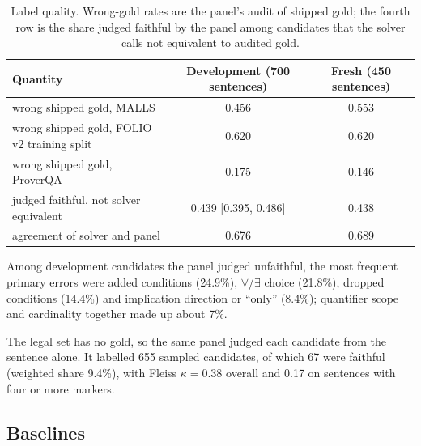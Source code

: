 \documentclass[11pt,letterpaper]{article}
\newcommand{\fe}{$\forall$/$\exists$}
\begin{document}
\begin{table}[!htbp]
  \centering
  \small
  \caption{Label quality. Wrong-gold rates are the panel's audit of shipped gold; the fourth row is the share judged faithful by the panel among candidates that the solver calls not equivalent to audited gold.}
  \label{tab:labels}
  \begin{tabular}{lcc}
    \toprule
    Quantity & Development (700 sentences) & Fresh (450 sentences) \\
    \midrule
    wrong shipped gold, MALLS & 0.456 & 0.553 \\
    wrong shipped gold, FOLIO v2 training split & 0.620 & 0.620 \\
    wrong shipped gold, ProverQA & 0.175 & 0.146 \\
    judged faithful, not solver equivalent & 0.439 [0.395, 0.486] & 0.438 \\
    agreement of solver and panel & 0.676 & 0.689 \\
    \bottomrule
  \end{tabular}
\end{table}

Among development candidates the panel judged unfaithful, the most frequent primary errors were added conditions (24.9\%), \fe{} choice (21.8\%), dropped conditions (14.4\%) and implication direction or ``only'' (8.4\%); quantifier scope and cardinality together made up about 7\%.

The legal set has no gold, so the same panel judged each candidate from the sentence alone. It labelled 655 sampled candidates, of which 67 were faithful (weighted share 9.4\%), with Fleiss $\kappa = 0.38$ overall and 0.17 on sentences with four or more markers.

\subsection{Baselines}
\label{sec:baselines}
\end{document}
